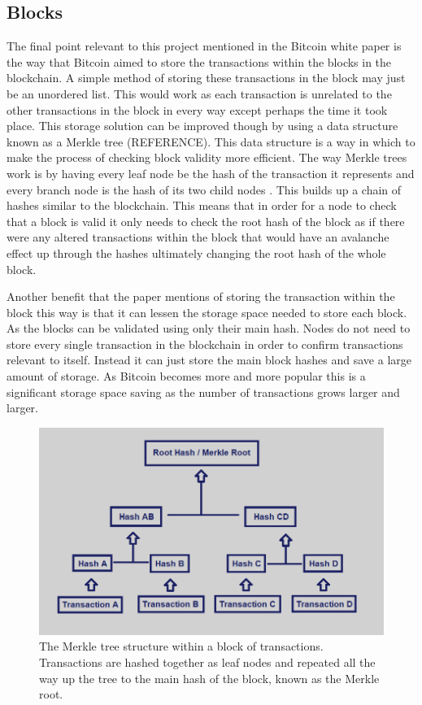 \documentclass{l4proj}
\begin{document}
\subsection{Blocks}
The final point relevant to this project mentioned in the Bitcoin white paper is the way that Bitcoin aimed to store
the transactions within the blocks in the blockchain. A simple method of storing these transactions in the block may
just be an unordered list. This would work as each transaction is unrelated to the other transactions in the block in
every way except perhaps the time it took place. This storage solution can be improved though by using a data structure
known as a Merkle tree (REFERENCE). This data structure is a way in which to make the process of checking block validity
more efficient. The way Merkle trees work is by having every leaf node be the hash of the transaction it represents 
and every branch node is the hash of its two child nodes . This builds up a chain of hashes similar to the blockchain.
This means that in order for a node to check that a block is valid it only needs to check the root hash of the block as
if there were any altered transactions within the block that would have an avalanche effect up through the hashes
ultimately changing the root hash of the whole block.

Another benefit that the paper mentions of storing the transaction within the block this way is that it can lessen
the storage space needed to store each block. As the blocks can be validated using only their main hash. Nodes do 
not need to store every single transaction in the blockchain in order to confirm transactions relevant to itself.
Instead it can just store the main block hashes and save a large amount of storage. As Bitcoin becomes more and
more popular this is a significant storage space saving as the number of transactions grows larger and larger.

\begin{figure}
    \centering
    \includegraphics[width=0.7\linewidth]{images/merkle-tree.png}    

    \caption{
        The Merkle tree structure within a block of transactions. Transactions are hashed together as leaf nodes
        and repeated all the way up the tree to the main hash of the block, known as the Merkle root.
    }

    \label{fig:merkle}
\end{figure}
\end{document}
